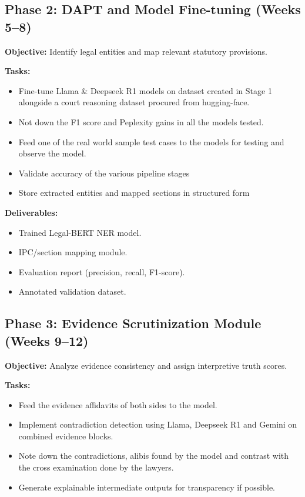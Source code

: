 \subsection{Phase 2:  DAPT and Model Fine-tuning (Weeks 5--8)}
\textbf{Objective:} Identify legal entities and map relevant statutory provisions.

\textbf{Tasks:}
\begin{itemize}
	\item Fine-tune Llama \& Deepseek R1 models on dataset created in Stage 1 alongside a court reasoning dataset procured from hugging-face.
	\item Not down the F1 score and Peplexity gains in all the models tested.
	\item Feed one of the real world sample test cases to the models for testing and observe the model.
	\item Validate accuracy of the various pipeline stages
	\item Store extracted entities and mapped sections in structured form
\end{itemize}

\textbf{Deliverables:}
\begin{itemize}
	\item Trained Legal-BERT NER model.
	\item IPC/section mapping module.
	\item Evaluation report (precision, recall, F1-score).
	\item Annotated validation dataset.
\end{itemize}

\subsection{Phase 3: Evidence Scrutinization Module (Weeks 9--12)}
\textbf{Objective:} Analyze evidence consistency and assign interpretive truth scores.

\textbf{Tasks:}
\begin{itemize}
	\item Feed the evidence affidavits of both sides to the model.
	\item Implement contradiction detection using Llama, Deepseek R1 and Gemini on combined evidence blocks.
	\item Note down the contradictions, alibis found by the model and contrast with the cross examination done by the lawyers.
	\item Generate explainable intermediate outputs for transparency if possible.
\end{itemize}

